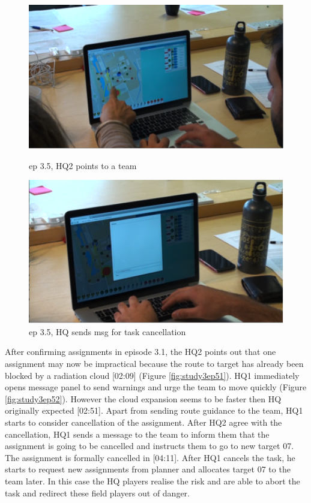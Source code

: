 \begin{figure}[ht]
\centering
\begin{minipage}[b]{0.45\linewidth}
\includegraphics[width=1\textwidth]{img/study3/ep51}
\caption{ep 3.5, HQ2 points to a team}
\label{fig:study3ep51}
\end{minipage}
\quad
\begin{minipage}[b]{0.45\linewidth}
 \includegraphics[width=1\textwidth]{img/study3/ep52}
\caption{ep 3.5, HQ sends msg for task cancellation}
\label{fig:study1ep52}
\end{minipage}
\end{figure}

After confirming assignments in episode 3.1, the HQ2 points out that one assignment may now be impractical because the route to target has already been blocked by a radiation cloud [02:09] (Figure \ref{fig:study3ep51}). HQ1 immediately opens message panel to send warnings and urge the team to move quickly (Figure \ref{fig:study3ep52}). However the cloud expansion seems to be faster then HQ originally expected [02:51]. Apart from sending route guidance to the team, HQ1 starts to consider cancellation of the assignment. After HQ2 agree with the cancellation, HQ1 sends a message to the team to inform them that the assignment is going to be cancelled and instructs them to go to new target 07. The assignment is formally cancelled in [04:11]. After HQ1 cancels the task, he starts to request new assignments from planner and allocates target 07 to the team later. In this case the HQ players realise the risk and are able to abort the task and redirect these field players out of danger.\\

